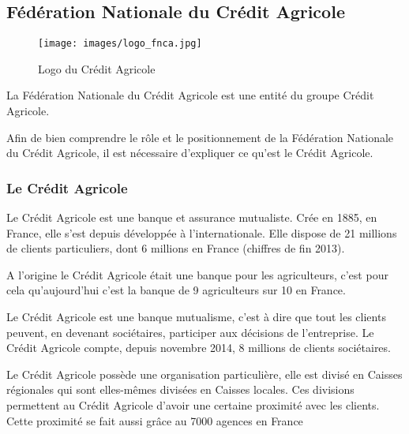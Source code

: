 \documentclass[12pt,a4paper]{article}
\begin{document}
\subsection{Fédération Nationale du Crédit Agricole}
\begin{figure}[h!]
\centering
\texttt{[image: images/logo\_fnca.jpg]}
\caption{Logo du Crédit Agricole}
\end{figure}
La Fédération Nationale du Crédit Agricole est une entité du groupe Crédit Agricole.\par
Afin de bien comprendre le rôle et le positionnement de la Fédération Nationale du Crédit Agricole, il est nécessaire d'expliquer ce qu'est le Crédit Agricole.
\subsubsection{Le Crédit Agricole}
Le Crédit Agricole est une banque et assurance mutualiste. Crée en 1885, en France, elle s'est depuis développée à l'internationale. Elle dispose de 21 millions de clients particuliers, dont 6 millions en France (chiffres de fin 2013).\par
A l'origine le Crédit Agricole était une banque pour les agriculteurs, c'est pour cela qu'aujourd'hui c'est la banque de 9 agriculteurs sur 10 en France.\par
Le Crédit Agricole est une banque mutualisme, c'est à dire que tout les clients peuvent, en devenant sociétaires, participer aux décisions de l'entreprise. Le Crédit Agricole compte, depuis novembre 2014, 8 millions de clients sociétaires.\par 
Le Crédit Agricole possède une organisation particulière, elle est divisé en Caisses régionales qui sont elles-mêmes divisées en Caisses locales. Ces divisions permettent au Crédit Agricole d'avoir une certaine proximité avec les clients. Cette proximité se fait aussi grâce au 7000 agences en France\par 
\end{document}

